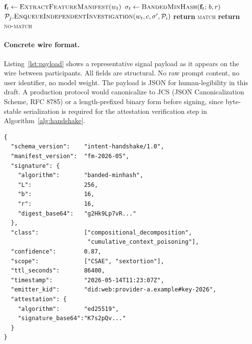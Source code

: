 \documentclass[11pt]{article}
\begin{document}
\begin{algorithm}[h]
\begin{algorithmic}[1]
\Statex
{} 
    \State $\mathbf{f}_t \gets \textsc{ExtractFeatureManifest}(w_t)$
    \State $\sigma_t \gets \textsc{BandedMinHash}(\mathbf{f}_t;\, b, r)$
         
            \State $\mathcal{P}_j.\textsc{EnqueueIndependentInvestigation}(w_t, c, \sigma', \mathcal{P}_i)$
            \State \textbf{return} \textsc{match}
        \EndIf
    \EndFor
    \State \textbf{return} \textsc{no-match}
\EndProcedure
\end{algorithmic}
\end{algorithm}

\paragraph{Concrete wire format.}
Listing~\ref{lst:payload} shows a representative signal payload as it appears on the wire between participants. All fields are structural. No raw prompt content, no user identifier, no model weight. The payload is JSON for human-legibility in this draft. A production protocol would canonicalize to JCS (JSON Canonicalization Scheme, RFC 8785) or a length-prefixed binary form before signing, since byte-stable serialization is required for the attestation verification step in Algorithm~\ref{alg:handshake}.

\begin{lstlisting}[language=jsonpretty, label={lst:payload}, caption={Representative handshake-protocol signal payload. The \texttt{signature} field is a 256-bit banded MinHash over the canonical feature manifest. The \texttt{class} field is the multi-label encoding over the six-class taxonomy of Table~\ref{tab:taxonomy}. No PII or raw prompt content traverses the network.}]
{
  "schema_version":    "intent-handshake/1.0",
  "manifest_version":  "fm-2026-05",
  "signature": {
    "algorithm":       "banded-minhash",
    "L":               256,
    "b":               16,
    "r":               16,
    "digest_base64":   "g2Hk9Lp7vR..."
  },
  "class":             ["compositional_decomposition",
                        "cumulative_context_poisoning"],
  "confidence":        0.87,
  "scope":             ["CSAE", "sextortion"],
  "ttl_seconds":       86400,
  "timestamp":         "2026-05-14T11:23:07Z",
  "emitter_kid":       "did:web:provider-a.example#key-2026",
  "attestation": {
    "algorithm":       "ed25519",
    "signature_base64":"K7s2pQv..."
  }
}
\end{lstlisting}
\end{document}
